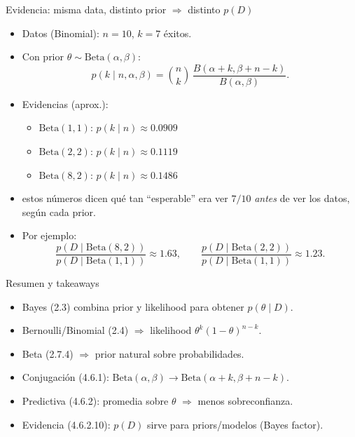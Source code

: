 \begin{frame}{Evidencia: misma data, distinto prior \(\Rightarrow\) distinto \(p(D)\)}
\begin{itemize}
  \item Datos (Binomial): \(n=10\), \(k=7\) éxitos.
  \item Con prior \(\theta\sim\mathrm{Beta}(\alpha,\beta)\):
  \[
    p(k\mid n,\alpha,\beta)=\binom{n}{k}\,\frac{B(\alpha+k,\beta+n-k)}{B(\alpha,\beta)}.
  \]
  \item Evidencias (aprox.):
  \begin{itemize}
    \item \(\mathrm{Beta}(1,1)\): \(p(k\mid n)\approx 0.0909\)
    \item \(\mathrm{Beta}(2,2)\): \(p(k\mid n)\approx 0.1119\)
    \item \(\mathrm{Beta}(8,2)\): \(p(k\mid n)\approx 0.1486\)
  \end{itemize}
  \item {} estos números dicen qué tan “esperable” era ver \(7/10\) \emph{antes} de ver los datos, según cada prior.
  \item {} Por ejemplo:
  \[
    \frac{p(D\mid \mathrm{Beta}(8,2))}{p(D\mid \mathrm{Beta}(1,1))}\approx 1.63,
    \qquad
    \frac{p(D\mid \mathrm{Beta}(2,2))}{p(D\mid \mathrm{Beta}(1,1))}\approx 1.23.
  \]
\end{itemize}
\end{frame}

\begin{frame}{Resumen y takeaways}
\begin{itemize}
  \item Bayes (2.3) combina prior y likelihood para obtener \(p(\theta\mid D)\).
  \item Bernoulli/Binomial (2.4) \(\Rightarrow\) likelihood \(\theta^{k}(1-\theta)^{n-k}\).
  \item Beta (2.7.4) \(\Rightarrow\) prior natural sobre probabilidades.
  \item Conjugación (4.6.1): \(\mathrm{Beta}(\alpha,\beta)\to \mathrm{Beta}(\alpha+k,\beta+n-k)\).
  \item Predictiva (4.6.2): promedia sobre \(\theta\) \(\Rightarrow\) menos sobreconfianza.
  \item Evidencia (4.6.2.10): \(p(D)\) sirve para  priors/modelos (Bayes factor).
\end{itemize}
\end{frame}

